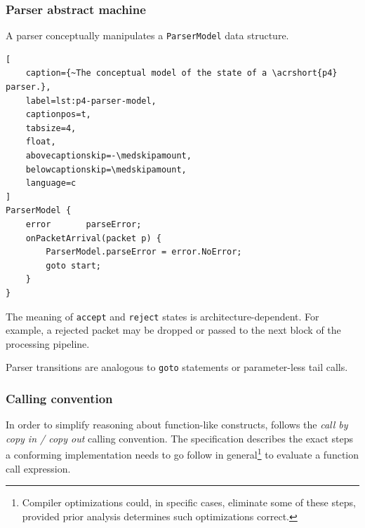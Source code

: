 

\subsubsection*{Parser abstract machine}

A parser conceptually manipulates a \texttt{ParserModel} data structure.

\begin{lstlisting}[
	caption={~The conceptual model of the state of a \acrshort{p4} parser.},
	label=lst:p4-parser-model,
	captionpos=t,
	tabsize=4,
	float,
	abovecaptionskip=-\medskipamount,
	belowcaptionskip=\medskipamount,
	language=c
]
ParserModel {
	error       parseError;
	onPacketArrival(packet p) {
		ParserModel.parseError = error.NoError;
		goto start;
	}
}
\end{lstlisting}

The meaning of \texttt{accept} and \texttt{reject} states is
architecture-dependent. For example, a rejected packet may be dropped or
passed to the next block of the processing pipeline.

Parser transitions are analogous to \texttt{goto} statements or parameter-less
tail calls.

\subsubsection*{Calling convention}

In order to simplify reasoning about function-like constructs, \pfs follows the
\emph{call by copy in / copy out} calling convention. The specification
describes the exact steps a conforming implementation needs to go follow in
general\footnote{Compiler optimizations could, in specific cases, eliminate some
of these steps, provided prior analysis determines such optimizations correct.}
to evaluate a function call expression.

